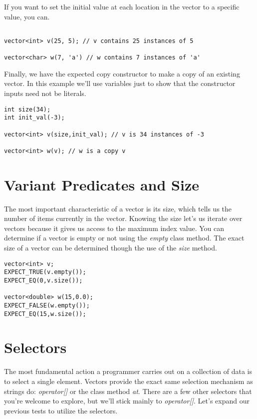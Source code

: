 \documentclass[]{tufte-handout}
\begin{document}
If you want to set the initial value at each location in the vector to a specific value, you can.

\begin{verbatim}

vector<int> v(25, 5); // v contains 25 instances of 5

vector<char> w(7, 'a') // w contains 7 instances of 'a'

\end{verbatim}

Finally, we have the expected copy constructor to make a copy of an existing vector. In this example we'll use variables just to show that the constructor inputs need not be literals.

\begin{verbatim}
int size(34);
int init_val(-3);

vector<int> v(size,init_val); // v is 34 instances of -3

vector<int> w(v); // w is a copy v
\end{verbatim}

\section{Variant Predicates and Size}

The most important characteristic of a vector is its size, which tells us the number of items currently in the vector.  Knowing the size let's us iterate over vectors because it gives us access to the maximum index value. You can determine if a vector is empty or not using the \textit{empty} class method.  The exact size of a vector can be determined though the use of the \textit{size} method. 
\begin{verbatim}
vector<int> v;
EXPECT_TRUE(v.empty());
EXPECT_EQ(0,v.size());

vector<double> w(15,0.0);
EXPECT_FALSE(w.empty());
EXPECT_EQ(15,w.size());

\end{verbatim}

\section{Selectors}

The most fundamental action a programmer carries out on a collection of data is to select a single element. Vectors provide the exact same selection mechanism as strings do: \textit{operator[]} or the class method \textit{at}. There are a few other selectors that you're welcome to explore, but we'll stick mainly to \textit{operator[]}.  Let's expand our previous tests to utilize the selectors.
\end{document}
